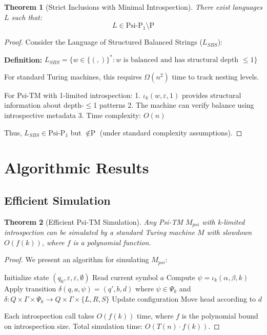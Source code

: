 \documentclass[11pt]{article}
\newtheorem{theorem}{Theorem}
\begin{document}
\begin{theorem}[Strict Inclusions with Minimal Introspection]
There exist languages $L$ such that:
$$L \in \text{Psi-P}_1 \setminus \text{P}$$
\end{theorem}

\begin{proof}
Consider the Language of Structured Balanced Strings ($L_{SBS}$):

\textbf{Definition:} $L_{SBS} = \{w \in \{(,)\}^* : w \text{ is balanced and has structural depth } \leq 1\}$

For standard Turing machines, this requires $\Omega(n^2)$ time to track nesting levels.

For Psi-TM with 1-limited introspection:
1. $\iota_k(w, \varepsilon, 1)$ provides structural information about depth-$\leq$1 patterns
2. The machine can verify balance using introspective metadata
3. Time complexity: $O(n)$

Thus, $L_{SBS} \in \text{Psi-P}_1$ but $\notin \text{P}$ (under standard complexity assumptions).
\end{proof}

\section{Algorithmic Results}

\subsection{Efficient Simulation}

\begin{theorem}[Efficient Psi-TM Simulation]
Any Psi-TM $M_{psi}$ with k-limited introspection can be simulated by a standard Turing machine $M$ with slowdown $O(f(k))$, where $f$ is a polynomial function.
\end{theorem}

\begin{proof}
We present an algorithm for simulating $M_{psi}$:

\begin{algorithm}
\caption{Psi-TM Simulation}
\begin{algorithmic}
\STATE Initialize state $(q_0, \varepsilon, \varepsilon, \emptyset)$
    \STATE Read current symbol $a$
    \STATE Compute $\psi = \iota_k(\alpha, \beta, k)$
    \STATE Apply transition $\delta(q, a, \psi) = (q', b, d)$ where $\psi \in \Psi_k$ and $\delta: Q \times \Gamma \times \Psi_k \to Q \times \Gamma \times \{L, R, S\}$
    \STATE Update configuration
    \STATE Move head according to $d$
\ENDWHILE
\end{algorithmic}
\end{algorithm}

Each introspection call takes $O(f(k))$ time, where $f$ is the polynomial bound on introspection size. Total simulation time: $O(T(n) \cdot f(k))$.
\end{proof}
\end{document}
